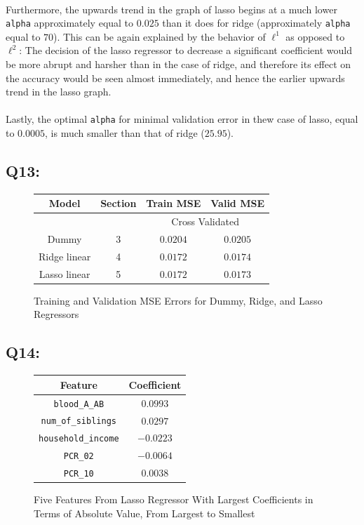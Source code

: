 \documentclass{article}
\newcommand{\code}[1]{\texttt{#1}}
\begin{document}
    \paragraph*{}
    Furthermore, the upwards trend in the graph of lasso begins at a much lower \code{alpha} approximately equal to $0.025$ than it does for ridge (approximately \code{alpha} equal to $70$). This can be again explained by the behavior of $\ell^1$ as opposed to $\ell^2$: The decision of the lasso regressor to decrease a significant coefficient would be more abrupt and harsher than in the case of ridge, and therefore its effect on the accuracy would be seen almost immediately, and hence the earlier upwards trend in the lasso graph.
    \paragraph*{}
    Lastly, the optimal \code{alpha} for minimal validation error in thew case of lasso, equal to $0.0005$, is much smaller than that of ridge ($25.95$).


\subsection*{Q13:}
    \begin{figure}[H]
        \centering
        \begin{tabular}{|c|c|c|c|}
            \hline
            \rowcolor{gray!60}
            Model & Section & Train MSE & Valid MSE\\ \hline
            \rowcolor{gray!20}
            ~&~ & \multicolumn{2}{c|}{Cross Validated}\\ \hline
            Dummy & 3 & $0.0204$ & $0.0205$\\ \hline
            Ridge linear & 4 & $0.0172$ & $0.0174$\\ \hline
            Lasso linear & 5 & $0.0172$ & $0.0173$\\ \hline
        \end{tabular}
        \caption{Training and Validation MSE Errors for Dummy, Ridge, and Lasso Regressors}
    \end{figure}
\subsection*{Q14:}
    \begin{figure}[H]
        \centering
        \begin{tabular}{|c|c|}
            \hline
            \rowcolor{gray!60}
            Feature & Coefficient \\ \hline
            \code{blood\_A\_AB} & $0.0993$ \\ \hline
            \code{num\_of\_siblings} & $0.0297$ \\ \hline
            \code{household\_income} & $-0.0223$ \\ \hline
            \code{PCR\_02} & $-0.0064$ \\ \hline
            \code{PCR\_10} & $0.0038$ \\ \hline
        \end{tabular}
        \caption{Five Features From Lasso Regressor With Largest Coefficients in Terms of Absolute Value, From Largest to Smallest}
    \end{figure}
\end{document}

